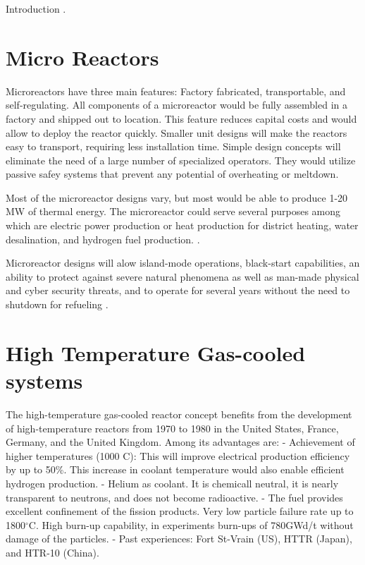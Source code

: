 Introduction \cite{huff_extensions_2014}.

\section{Micro Reactors}

Microreactors have three main features: Factory fabricated, transportable, and self-regulating. All components of a microreactor would be fully assembled in a factory and shipped out to location. This feature reduces capital costs and would allow to deploy the reactor quickly. Smaller unit designs will make the reactors easy to transport, requiring less installation time. Simple design concepts will eliminate the need of a large number of specialized operators. They would utilize passive safey systems that prevent any potential of overheating or meltdown.

Most of the microreactor designs vary, but most would be able to produce 1-20 MW of thermal energy. The microreactor could serve several purposes among which are electric power production or heat production for district heating, water desalination, and hydrogen fuel production.
\cite{noauthor_ultimate_2019}.

Microreactor designs will alow island-mode operations, black-start capabilities, an ability to protect against severe natural phenomena as well as man-made physical and cyber security threats, and to operate for several years without the need to shutdown for refueling \cite{nichol_roadmap_2018}.

\section{High Temperature Gas-cooled systems}

The high-temperature gas-cooled reactor concept benefits from the development of high-temperature reactors from 1970 to 1980 in the United States, France, Germany, and the United Kingdom. 
Among its advantages are:
- Achievement of higher temperatures (1000 C): This will improve electrical production efficiency by up to 50\%. This increase in coolant temperature would also enable efficient hydrogen production.
- Helium as coolant. It is chemicall neutral, it is nearly transparent to neutrons, and does not become radioactive.
- The fuel provides excellent confinement of the fission products. Very low particle failure rate up to 1800$^{\circ}$C. High burn-up capability, in experiments burn-ups of 780GWd/t without damage of the particles.
- Past experiences: Fort St-Vrain (US), HTTR (Japan), and HTR-10 (China).
\cite{france_gas-cooled_2006}

